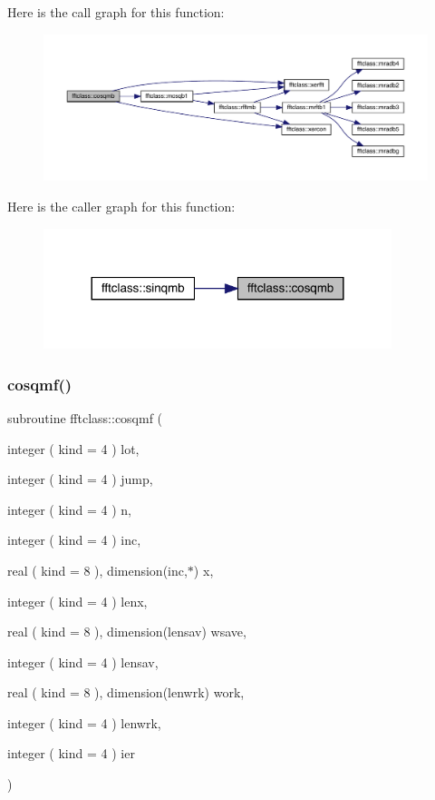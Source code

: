 Here is the call graph for this function\+:\nopagebreak
\begin{figure}[H]
\begin{center}
\leavevmode
\includegraphics[width=350pt]{namespacefftclass_a766146700483880896edee5e866f29a6_cgraph}
\end{center}
\end{figure}
Here is the caller graph for this function\+:\nopagebreak
\begin{figure}[H]
\begin{center}
\leavevmode
\includegraphics[width=288pt]{namespacefftclass_a766146700483880896edee5e866f29a6_icgraph}
\end{center}
\end{figure}
\mbox{\label{namespacefftclass_a48467d0cccf9f7f93786f4997fe714f5}} 
\subsubsection{\texorpdfstring{cosqmf()}{cosqmf()}}
{\footnotesize\ttfamily subroutine fftclass\+::cosqmf (\begin{DoxyParamCaption}\item[{integer ( kind = 4 )}]{lot,  }\item[{integer ( kind = 4 )}]{jump,  }\item[{integer ( kind = 4 )}]{n,  }\item[{integer ( kind = 4 )}]{inc,  }\item[{real ( kind = 8 ), dimension(inc,$\ast$)}]{x,  }\item[{integer ( kind = 4 )}]{lenx,  }\item[{real ( kind = 8 ), dimension(lensav)}]{wsave,  }\item[{integer ( kind = 4 )}]{lensav,  }\item[{real ( kind = 8 ), dimension(lenwrk)}]{work,  }\item[{integer ( kind = 4 )}]{lenwrk,  }\item[{integer ( kind = 4 )}]{ier }\end{DoxyParamCaption})}

